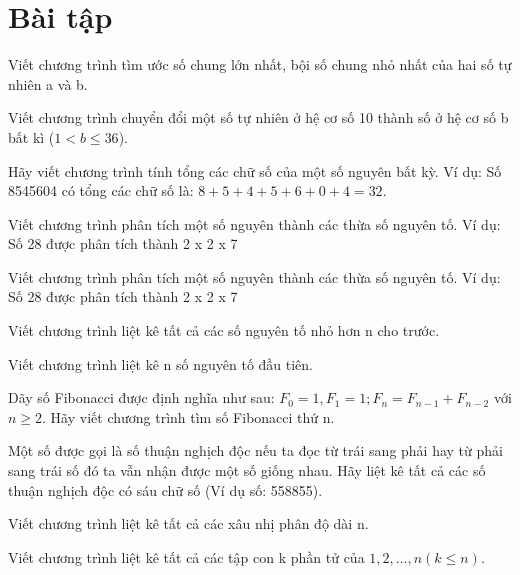 \section{Bài tập}

\begin{exlist}
\item Viết chương trình tìm ước số chung lớn nhất, bội số chung nhỏ nhất của hai số tự nhiên a và b.

\item Viết chương trình chuyển đổi một số tự nhiên ở hệ cơ số 10 thành số ở hệ cơ số b bất kì ($1 < b \leq 36$).

\item Hãy viết chương trình tính tổng các chữ số của một số nguyên bất kỳ. Ví dụ: Số 8545604 có tổng các chữ số là: $8+5+4+5+6+0+4= 32$.

\item Viết chương trình phân tích một số nguyên thành các thừa số nguyên tố. Ví dụ: Số 28 được phân tích thành 2 x 2 x 7

\item Viết chương trình phân tích một số nguyên thành các thừa số nguyên tố. Ví dụ: Số 28 được phân tích thành 2 x 2 x 7

\item Viết chương trình liệt kê tất cả các số nguyên tố nhỏ hơn n cho trước.

\item Viết chương trình liệt kê n số nguyên tố đầu tiên.

\item Dãy số Fibonacci được định nghĩa như sau: $F_0 =1, F_1 = 1; F_n = F_{n-1} + F_{n-2}$ với $n\geq2$. Hãy viết chương trình tìm số Fibonacci thứ n.

\item Một số được gọi là số thuận nghịch độc nếu ta đọc từ trái sang phải hay từ phải sang trái số đó ta vẫn nhận được một số giống nhau. Hãy liệt kê tất cả các số thuận nghịch độc có sáu chữ số (Ví dụ số: 558855).

\item Viết chương trình liệt kê tất cả các xâu nhị phân độ dài n.

\item Viết chương trình liệt kê tất cả các tập con k phần tử của $1, 2, ..., n (k \leq n)$.
\end{exlist}










